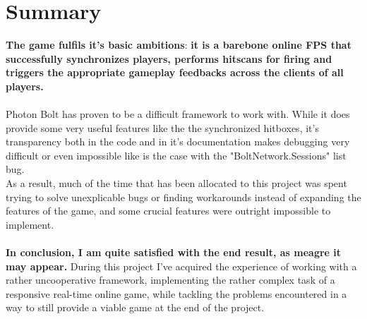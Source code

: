 \documentclass[12pt,a4paper]{article}
\begin{document}
\section{Summary}
\textbf{The game fulfils it's basic ambitions}: \textbf{it is a barebone online FPS that successfully synchronizes players, performs hitscans for firing and triggers the appropriate gameplay feedbacks across the clients of all players.}\\\\
Photon Bolt has proven to be a difficult framework to work with. While it does provide some very useful features like the the synchronized hitboxes, it's transparency both in the code and in it's documentation makes debugging very difficult or even impossible like is the case with the "BoltNetwork.Sessions" list bug.\\
As a result, much of the time that has been allocated to this project was spent trying to solve unexplicable bugs or finding workarounds instead of expanding the features of the game, and some crucial features were outright impossible to implement.\\\\
\textbf{In conclusion, I am quite satisfied with the end result, as meagre it may appear.} During this project I've acquired the experience of working with a rather uncooperative framework, implementing the rather complex task of a responsive real-time online game, while tackling the problems encountered in a way to still provide a viable game at the end of the project.
\end{document}
